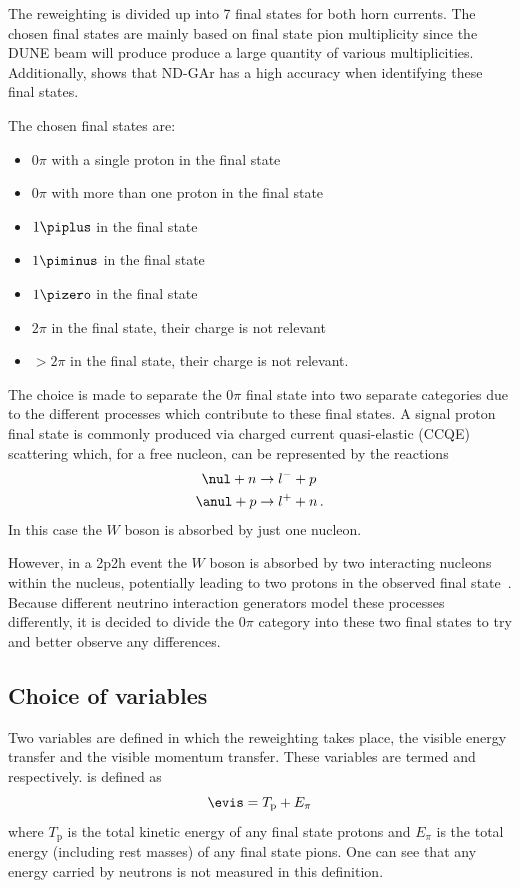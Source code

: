 The reweighting is divided up into 7 final states for both horn currents.
The chosen final states are mainly based on final state pion multiplicity since the DUNE beam will produce produce a large quantity of various multiplicities.
Additionally,  shows that ND-GAr has a high accuracy when identifying these final states.

The chosen final states are:
\begin{itemize}
	\item $0\pi$ with a single proton in the final state
	\item $0\pi$ with more than one proton in the final state
	\item $1\piplus$ in the final state
	\item $1\piminus$ in the final state
	\item $1\pizero$ in the final state
	\item $2\pi$ in the final state, their charge is not relevant
	\item $>2\pi$ in the final state, their charge is not relevant.
\end{itemize}

The choice is made to separate the $0\pi$ final state into two separate categories due to the different processes which contribute to these final states.
A signal proton final state is commonly produced via charged current quasi-elastic (CCQE) scattering which, for a free nucleon, can be represented by the reactions
\begin{align}
	\nul + n &\rightarrow l^{-} + p \\
	\anul + p &\rightarrow l^{+} + n \, .
\end{align}
In this case the $W$ boson is absorbed by just one nucleon.

However, in a 2p2h event the $W$ boson is absorbed by two interacting nucleons within the nucleus, potentially leading to two protons in the observed final state~\cite{2p2h}.
Because different neutrino interaction generators model these processes differently, it is decided to divide the $0\pi$ category into these two final states to try and better observe any differences.

\subsection{Choice of variables}

Two variables are defined in which the reweighting takes place, the visible energy transfer and the visible momentum transfer. 
These variables are termed \evis and \pvis respectively.
\evis is defined as 
\begin{equation}
	\evis = T_{\textrm{p}} + E_{\pi}
\end{equation}
where $T_{\textrm{p}}$ is the total kinetic energy of any final state protons and $E_{\pi}$ is the total energy (including rest masses) of any final state pions.
One can see that any energy carried by neutrons is not measured in this definition.


